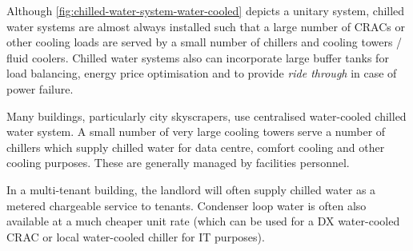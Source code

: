 \documentclass{pgnotes}
\begin{document}
Although \autoref{fig:chilled-water-system-water-cooled} depicts a unitary system, chilled water systems are almost always installed such that a large number of CRACs or other cooling loads are served by a small number of chillers and cooling towers / fluid coolers.
Chilled water systems also can incorporate large buffer tanks for load balancing, energy price optimisation and to provide \textit{ride through} in case of power failure.

Many buildings, particularly city skyscrapers, use centralised water-cooled chilled water system. 
A small number of very large cooling towers serve a number of chillers which supply chilled water for data centre, comfort cooling and other cooling purposes.
These are generally managed by facilities personnel. 

In a multi-tenant building, the landlord will often supply chilled water as a metered chargeable service to tenants.
Condenser loop water is often also available at a much cheaper unit rate (which can be used for a DX water-cooled CRAC or local water-cooled chiller for IT purposes).
\end{document}

